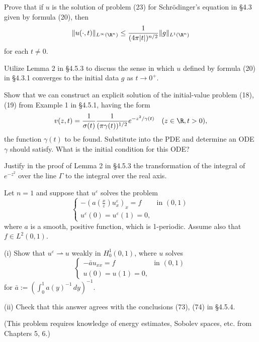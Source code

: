 \begin{exercise}
Prove that if $u$ is the solution of problem (23) for Schr\"odinger's equation in \S4.3 given by formula (20), then
$$\|u(\cdot, t)\|_{L^\infty(\R^n)} \leq \frac{1}{(4\pi |t|)^{n/2}} \|g\|_{L^1(\R^n)}$$
for each $t \neq 0$.
\end{exercise}

\begin{exercise}
Utilize Lemma 2 in \S4.5.3 to discuss the sense in which $u$ defined by formula (20) in \S4.3.1 converges to the initial data $g$ as $t \to 0^+$.
\end{exercise}

\begin{exercise}
Show that we can construct an explicit solution of the initial-value problem (18), (19) from Example 1 in \S4.5.1, having the form
$$v(z, t) = \frac{1}{\sigma(t)} \frac{1}{(\pi\gamma(t))^{1/2}} e^{-z^2/\gamma(t)} \quad (z \in \R, t > 0),$$
the function $\gamma(t)$ to be found. Substitute into the PDE and determine an ODE $\gamma$ should satisfy. What is the initial condition for this ODE?
\end{exercise}

\begin{exercise}
Justify in the proof of Lemma 2 in \S4.5.3 the transformation of the integral of $e^{-z^2}$ over the line $\Gamma$ to the integral over the real axis.
\end{exercise}

\begin{exercise}
Let $n=1$ and suppose that $u^\varepsilon$ solves the problem
$$\begin{cases} -(a(\frac{x}{\varepsilon})u^\varepsilon_x)_x = f & \text{in } (0,1) \\ u^\varepsilon(0)=u^\varepsilon(1)=0, \end{cases}$$
where $a$ is a smooth, positive function, which is 1-periodic. Assume also that $f\in L^2(0,1)$.

(i) Show that $u^\varepsilon\rightharpoonup u$ weakly in $H_0^1(0,1)$, where $u$ solves
$$\begin{cases} -\bar a u_{xx}=f & \text{in } (0,1) \\ u(0)=u(1)=0, \end{cases}$$
for $\bar a := (\int_0^1 a(y)^{-1}\,dy)^{-1}$.

(ii) Check that this answer agrees with the conclusions (73), (74) in \S4.5.4.

(This problem requires knowledge of energy estimates, Sobolev spaces, etc. from Chapters 5, 6.)
\end{exercise}

